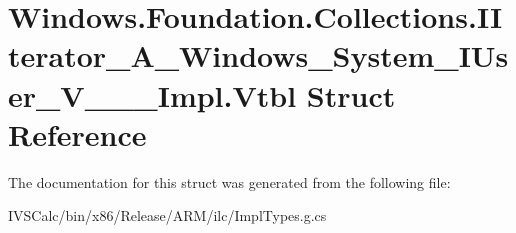 \hypertarget{struct_windows_1_1_foundation_1_1_collections_1_1_i_iterator___a___windows___system___i_user___v_______impl_1_1_vtbl}{}\section{Windows.\+Foundation.\+Collections.\+I\+Iterator\+\_\+\+A\+\_\+\+Windows\+\_\+\+System\+\_\+\+I\+User\+\_\+\+V\+\_\+\+\_\+\+\_\+\+Impl.\+Vtbl Struct Reference}
\label{struct_windows_1_1_foundation_1_1_collections_1_1_i_iterator___a___windows___system___i_user___v_______impl_1_1_vtbl}


The documentation for this struct was generated from the following file\+:\begin{DoxyCompactItemize}
\item 
I\+V\+S\+Calc/bin/x86/\+Release/\+A\+R\+M/ilc/Impl\+Types.\+g.\+cs\end{DoxyCompactItemize}
